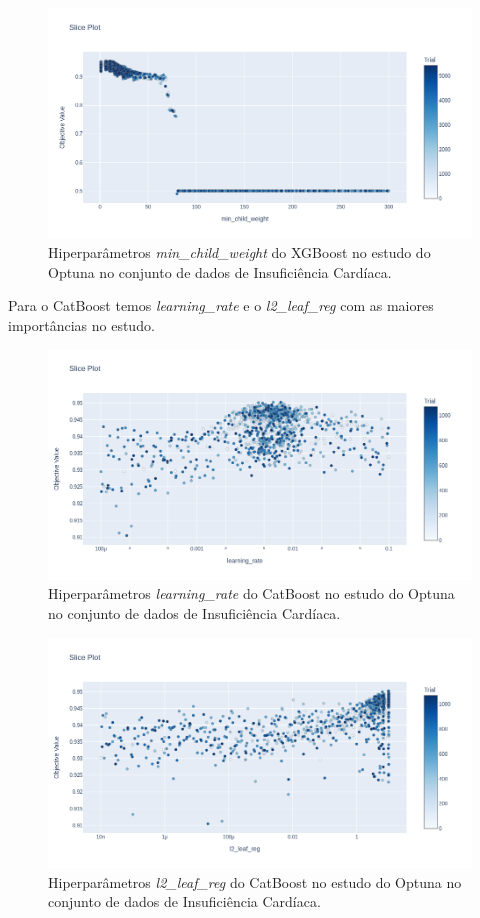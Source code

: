 \begin{figure}[H]
 \caption{Hiperparâmetros \textit{min\_child\_weight} do XGBoost no estudo do Optuna no conjunto de dados de Insuficiência Cardíaca.}
 \label{fig:op:heart:min:xgb}
 \centering
 \includegraphics[scale=0.3]{images/optuna_xgboost_min_heart.png}
\end{figure}

Para o CatBoost temos \textit{learning\_rate} e o \textit{l2\_leaf\_reg} com as maiores importâncias no estudo.
\begin{figure}[H]
 \caption{Hiperparâmetros \textit{learning\_rate} do CatBoost no estudo do Optuna no conjunto de dados de Insuficiência Cardíaca.}
 \label{fig:op:heart:learn:cat}
 \centering
 \includegraphics[scale=0.3]{images/optuna_catboost_learning_heart.png}
\end{figure}
\begin{figure}[H]
 \caption{Hiperparâmetros \textit{l2\_leaf\_reg} do CatBoost no estudo do Optuna no conjunto de dados de Insuficiência Cardíaca.}
 \label{fig:op:heart:l2:cat}
 \centering
 \includegraphics[scale=0.3]{images/optuna_catboost_l2_heart.png}
\end{figure}

